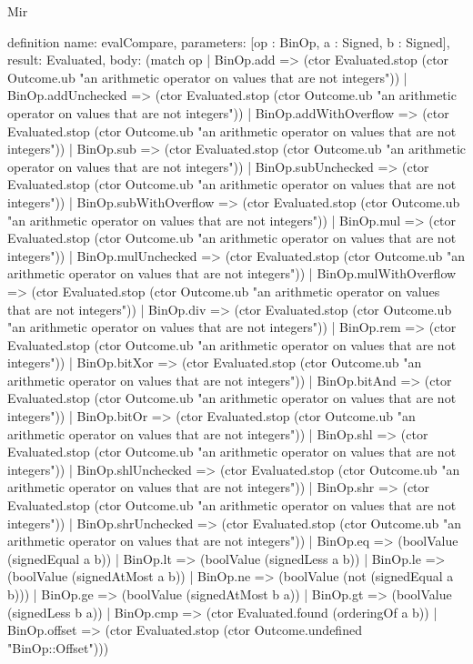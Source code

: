 \begin{lexlean}{Mir}
\begin{semanticmodule}
definition{
  name: evalCompare,
  parameters: [op : BinOp, a : Signed, b : Signed],
  result: Evaluated,
  body: (match op
    | BinOp.add => (ctor Evaluated.stop (ctor Outcome.ub "an arithmetic operator on values that are not integers"))
    | BinOp.addUnchecked => (ctor Evaluated.stop (ctor Outcome.ub "an arithmetic operator on values that are not integers"))
    | BinOp.addWithOverflow => (ctor Evaluated.stop (ctor Outcome.ub "an arithmetic operator on values that are not integers"))
    | BinOp.sub => (ctor Evaluated.stop (ctor Outcome.ub "an arithmetic operator on values that are not integers"))
    | BinOp.subUnchecked => (ctor Evaluated.stop (ctor Outcome.ub "an arithmetic operator on values that are not integers"))
    | BinOp.subWithOverflow => (ctor Evaluated.stop (ctor Outcome.ub "an arithmetic operator on values that are not integers"))
    | BinOp.mul => (ctor Evaluated.stop (ctor Outcome.ub "an arithmetic operator on values that are not integers"))
    | BinOp.mulUnchecked => (ctor Evaluated.stop (ctor Outcome.ub "an arithmetic operator on values that are not integers"))
    | BinOp.mulWithOverflow => (ctor Evaluated.stop (ctor Outcome.ub "an arithmetic operator on values that are not integers"))
    | BinOp.div => (ctor Evaluated.stop (ctor Outcome.ub "an arithmetic operator on values that are not integers"))
    | BinOp.rem => (ctor Evaluated.stop (ctor Outcome.ub "an arithmetic operator on values that are not integers"))
    | BinOp.bitXor => (ctor Evaluated.stop (ctor Outcome.ub "an arithmetic operator on values that are not integers"))
    | BinOp.bitAnd => (ctor Evaluated.stop (ctor Outcome.ub "an arithmetic operator on values that are not integers"))
    | BinOp.bitOr => (ctor Evaluated.stop (ctor Outcome.ub "an arithmetic operator on values that are not integers"))
    | BinOp.shl => (ctor Evaluated.stop (ctor Outcome.ub "an arithmetic operator on values that are not integers"))
    | BinOp.shlUnchecked => (ctor Evaluated.stop (ctor Outcome.ub "an arithmetic operator on values that are not integers"))
    | BinOp.shr => (ctor Evaluated.stop (ctor Outcome.ub "an arithmetic operator on values that are not integers"))
    | BinOp.shrUnchecked => (ctor Evaluated.stop (ctor Outcome.ub "an arithmetic operator on values that are not integers"))
    | BinOp.eq => (boolValue (signedEqual a b))
    | BinOp.lt => (boolValue (signedLess a b))
    | BinOp.le => (boolValue (signedAtMost a b))
    | BinOp.ne => (boolValue (not (signedEqual a b)))
    | BinOp.ge => (boolValue (signedAtMost b a))
    | BinOp.gt => (boolValue (signedLess b a))
    | BinOp.cmp => (ctor Evaluated.found (orderingOf a b))
    | BinOp.offset => (ctor Evaluated.stop (ctor Outcome.undefined "BinOp::Offset")))
}


\end{semanticmodule}
\end{lexlean}

